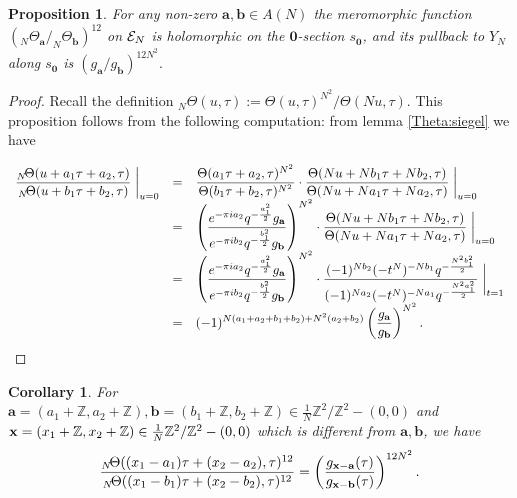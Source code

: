 \documentclass[12pt,amstex,amssymb]{article}
\theoremstyle{plain}
\newtheorem{proposition}[theorem]{Proposition}
\newtheorem{corollary}[theorem]{Corollary}
\theoremstyle{definition}
\def\cE{{\cal E}}
\def\Z{{\mathbb Z}}
\def\bx {{\bf x}}
\newcommand{\be}{\begin{eqnarray*}}
\newcommand{\ee}{\end{eqnarray*}}
\newcommand{\ba}{\mathbf{a}}
\newcommand{\bb}{\mathbf{b}}
\begin{document}
\begin{proposition}\label{vartheta:siegelspecial}
For any non-zero $\ba,\bb \in A(N)$ the meromorphic function  $(_{N}\!\Theta_{\ba}/_{N}\!\Theta_{\bb})^{12}$ on $\cE_N$ is holomorphic on the $\mathbf{0}$-section $s_{\mathbf{0}}$, and its pullback to $Y_N$ along $s_{\mathbf{0}}$ is
$
 \left(g_\ba / g_\bb\right)^{12N^2}.
$
\end{proposition}

\begin{proof}  
	Recall the definition $_{N}\!\Theta(u,\tau) :=  \Theta(u,\tau)^{N^2}/\Theta(Nu,\tau)$.
	This proposition follows from the following computation: from lemma \ref{Theta:siegel} we have
	
	$$
	\begin{array}{rcl}
		\displaystyle \frac{_{N}\!\Theta(u+ a_1\tau + a_2,\tau)}{_{N}\!\Theta(u+b_1\tau+b_2,\tau)}\biggm|_{u=0} 
		&=& \displaystyle \frac{\Theta(a_1\tau + a_2,\tau)^{N^2}}{\Theta(b_1\tau +b_2,\tau)^{N^2}} \cdot \frac{\Theta(Nu+Nb_1\tau + Nb_2,\tau)}{\Theta(Nu + Na_1\tau +Na_2,\tau)}\biggm|_{u=0}\\
		&=& \displaystyle \left(\frac{e^{-\pi i a_2} q^{-\frac{a_1^2}{2}}g_\ba}{e^{-\pi i b_2} q^{-\frac{b_1^2}{2}}g_\bb}\right)^{N^2}\cdot \frac{\Theta(Nu+Nb_1\tau + Nb_2,\tau)}{\Theta(Nu + Na_1\tau +Na_2,\tau)}\biggm|_{u=0}\\
		&=& \displaystyle \left(\frac{e^{-\pi i a_2} q^{-\frac{a_1^2}{2}}g_\ba}{e^{-\pi i b_2} q^{-\frac{b_1^2}{2}}g_\bb}\right)^{N^2}\cdot 
		\frac{(-1)^{Nb_2} (-t^{N})^{-Nb_1}q^{-\frac{N^2b_1^2}{2}}}{(-1)^{Na_2} (-t^{N})^{-Na_1}q^{-\frac{N^2a_1^2}{2}}}\biggm|_{t=1}\\
		&=& \displaystyle (-1)^{N(a_1+a_2 + b_1+ b_2) + N^2(a_2+b_2)}\left(\frac{g_\ba}{g_\bb}\right)^{N^2}.\\
	\end{array}
	$$
\end{proof}
\begin{corollary}\label{TS}
	For $\ba=(a_1+\Z,a_2+\Z), \bb=(b_1+\Z,b_2+\Z) \in \frac{1}{N}\Z^2/\Z^2-(0,0)$ and $\bx=(x_1+\Z,x_2+\Z) \in \frac{1}{N}\Z^2/\Z^2-(0,0)$ which is different from $\ba,\bb$, we have
	\be
	\frac{_{N}\!\Theta ((x_1-a_1)\tau+(x_2-a_2), \tau)^{12}}{_{N}\!\Theta ((x_1-b_1)\tau+(x_2-b_2), \tau)^{12}} =\left(\frac{g_{\bx-\ba}(\tau)}{g_{\bx-\bb}(\tau)}\right)^{12N^2}.
	\ee
\end{corollary}
\end{document}
